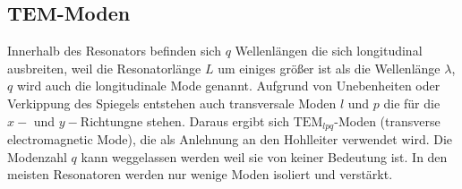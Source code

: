 \subsection[TEM-Moden]{$\mathbf{TEM}$-Moden}
Innerhalb des Resonators befinden sich $q$ Wellenlängen die sich longitudinal ausbreiten, weil die Resonatorlänge $L$ um einiges größer ist als die Wellenlänge $\lambda$, $q$ wird auch die longitudinale Mode genannt. Aufgrund von Unebenheiten oder Verkippung des Spiegels entstehen auch transversale Moden $l$ und $p$ die für die $x-$ und $y-$Richtungne stehen. Daraus ergibt sich $\mathrm{TEM}_{lpq}$-Moden (transverse electromagnetic Mode), die als Anlehnung an den Hohlleiter verwendet wird. Die Modenzahl $q$ kann weggelassen werden weil sie von keiner Bedeutung ist. In den meisten Resonatoren werden nur wenige Moden isoliert und verstärkt.\\

